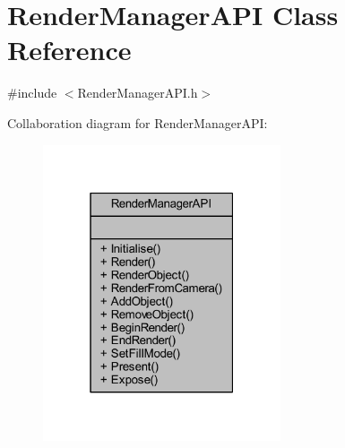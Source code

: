 \hypertarget{class_render_manager_a_p_i}{}\section{Render\+Manager\+A\+PI Class Reference}
\label{class_render_manager_a_p_i}


{\ttfamily \#include $<$Render\+Manager\+A\+P\+I.\+h$>$}



Collaboration diagram for Render\+Manager\+A\+PI\+:
\nopagebreak
\begin{figure}[H]
\begin{center}
\leavevmode
\includegraphics[width=199pt]{class_render_manager_a_p_i__coll__graph}
\end{center}
\end{figure}
